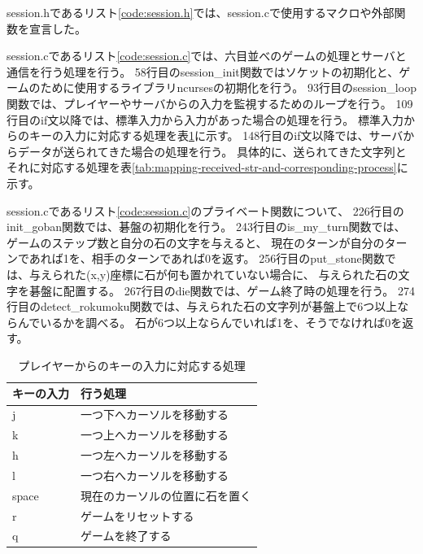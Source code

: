 \documentclass[a4j, titlepage, 10pt]{jsarticle}
\begin{document}
\lstset{ numbers = left }


session.hであるリスト\ref{code:session.h}では、session.cで使用するマクロや外部関数を宣言した。

\lstset{ numbers = left }


session.cであるリスト\ref{code:session.c}では、六目並べのゲームの処理とサーバと通信を行う処理を行う。
58行目のsession\_init関数ではソケットの初期化と、ゲームのために使用するライブラリncursesの初期化を行う。
93行目のsession\_loop関数では、プレイヤーやサーバからの入力を監視するためのループを行う。
109行目のif文以降では、標準入力から入力があった場合の処理を行う。
標準入力からのキーの入力に対応する処理を表\ref{tab:player-key-mapping}に示す。
148行目のif文以降では、サーバからデータが送られてきた場合の処理を行う。
具体的に、送られてきた文字列とそれに対応する処理を表\ref{tab:mapping-received-str-and-corresponding-process}に示す。

session.cであるリスト\ref{code:session.c}のプライベート関数について、
226行目のinit\_goban関数では、碁盤の初期化を行う。
243行目のis\_my\_turn関数では、ゲームのステップ数と自分の石の文字を与えると、
現在のターンが自分のターンであれば1を、相手のターンであれば0を返す。
256行目のput\_stone関数では、与えられた(x,y)座標に石が何も置かれていない場合に、
与えられた石の文字を碁盤に配置する。
267行目のdie関数では、ゲーム終了時の処理を行う。
274行目のdetect\_rokumoku関数では、与えられた石の文字列が碁盤上で6つ以上ならんでいるかを調べる。
石が6つ以上ならんでいれば1を、そうでなければ0を返す。

\lstset{ numbers = left }


\begin{table}[H]
  \centering
  \caption{プレイヤーからのキーの入力に対応する処理}
  \label{tab:player-key-mapping}
  \begin{tabular}{ll} \toprule
    キーの入力 & 行う処理 \\
    \midrule
    j & 一つ下へカーソルを移動する \\
    k & 一つ上へカーソルを移動する \\
    h & 一つ左へカーソルを移動する \\
    l & 一つ右へカーソルを移動する \\
    space & 現在のカーソルの位置に石を置く \\
    r & ゲームをリセットする \\
    q & ゲームを終了する \\
    \bottomrule
  \end{tabular}
\end{table}
\end{document}
